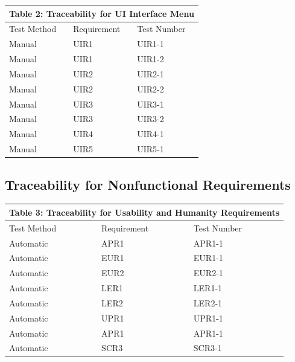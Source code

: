 \documentclass[12pt, titlepage]{article}
\begin{document}
\begin{tabular}{|p{}|p{}|p{}|}

\hline \multicolumn{3}{|c|}{Table 2: Traceability for UI Interface Menu}\\

\hline Test Method&Requirement&Test Number\\

\hline Manual&UIR1&UIR1-1\\

\hline Manual&UIR1&UIR1-2\\

\hline Manual&UIR2&UIR2-1\\

\hline Manual&UIR2&UIR2-2\\

\hline Manual&UIR3&UIR3-1\\

\hline Manual&UIR3&UIR3-2\\

\hline Manual&UIR4&UIR4-1\\

\hline Manual&UIR5&UIR5-1\\

\hline

\end{tabular}
\subsection{Traceability for Nonfunctional Requirements}

\begin{tabular}{|p{}|p{}|p{}|}

\hline \multicolumn{3}{|c|}{Table 3: Traceability for Usability and Humanity Requirements}\\

\hline Test Method&Requirement&Test Number\\

\hline Automatic&APR1&APR1-1\\

\hline Automatic&EUR1&EUR1-1\\

\hline Automatic&EUR2&EUR2-1\\

\hline Automatic&LER1&LER1-1\\

\hline Automatic&LER2&LER2-1\\

\hline Automatic&UPR1&UPR1-1\\

\hline Automatic&APR1&APR1-1\\

\hline Automatic&SCR3&SCR3-1\\

\hline

\end{tabular}
\end{document}
